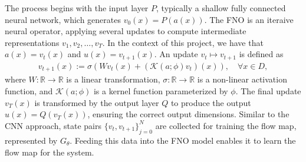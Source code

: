 The process begins with the input layer $P$, typically a shallow fully connected neural network, which generates $v_0(x) = P(a(x))$.
The FNO is an iteraive neural operator, applying several updates to compute intermediate representations $v_1, v_2, \ldots, v_T$.
In the context of this project, we have that $a(x) = v_t(x)$ and $u(x) = v_{t+1}(x)$.
An update $v_t \mapsto v_{t+1}$ is defined as
\begin{align}
    v_{t+1}(x) := \sigma \left( W v_t(x) + \left( \mathcal{K}(a;\phi)v_t \right) (x) \right), \quad \forall x \in D,
\end{align}
where $W: \mathbb{R} \to \mathbb{R}$ is a linear transformation, $\sigma: \mathbb{R} \to \mathbb{R}$ is a non-linear activation function, and $\mathcal{K}(a;\phi)$ is a kernel function parameterized by $\phi$.
The final update $v_T(x)$ is transformed by the output layer $Q$ to produce the output $u(x) = Q(v_T(x))$, ensuring the correct output dimensions.
Similar to the CNN approach, state pairs ${\{v_t, v_{t+1}\}}_{j=0}^N$ are collected for training the flow map, represented by $G_{\theta}$.
Feeding this data into the FNO model enables it to learn the flow map for the system.

